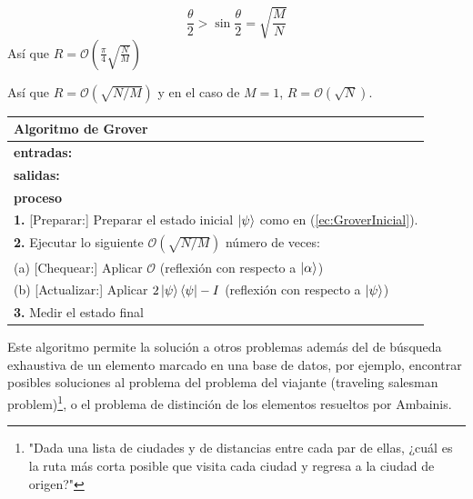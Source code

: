 \begin{appendix}
\begin{equation}
    \frac{\theta}{2}>\sin\frac{\theta}{2}=\sqrt{\frac{M}{N}}
\end{equation}
Así que $R=\mathcal{O}(\frac{\pi}{4}\sqrt{\frac{N}{M}})$

Así que $R=\mathcal{O}(\sqrt{N/M})$ y en el caso de $M=1$, $R=\mathcal{O}(\sqrt{N})$.

\begin{center}
    \begin{tabular}{l}
    \hline \textbf{Algoritmo de Grover}\\\hline
    \textbf{entradas:} \\
    \textbf{salidas:}\\\hline
    \textbf{proceso}\\
    \textbf{1.} [Preparar:] Preparar el estado inicial $\ket{\psi}$ como en (\ref{ec:GroverInicial}).\\
\textbf{2.} Ejecutar lo siguiente $\mathcal{O}(\sqrt{N/M})$ número de veces:\\
(a) [Chequear:] Aplicar $\mathcal{O}$ (reflexión con respecto a $\ket{\alpha}$)\\
(b) [Actualizar:] Aplicar $2\ket{\psi}\bra{\psi}-I$ (reflexión con respecto a $\ket{\psi}$)\\
\textbf{3.} Medir el estado final\\\hline
    \end{tabular}{}
\end{center}{}
Este algoritmo permite la solución a otros problemas además del de búsqueda exhaustiva de un elemento marcado en una base de datos, por ejemplo, encontrar posibles soluciones al problema del problema del viajante (traveling salesman problem)\footnote{"Dada una lista de ciudades y de distancias entre cada par de ellas, ¿cuál es la ruta más corta posible que visita cada ciudad y regresa a la ciudad de origen?"}, o el problema de distinción de los elementos resueltos por Ambainis.


\end{appendix}
